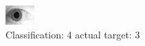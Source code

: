 \begin{figure}[h!]
\begin{center}
\includegraphics[width=0.60\columnwidth]{figures/ID1923_class_4_target_3.png}
\end{center}
\caption{ Classification: 4 actual target: 3}
\label{fig:ID1923_class_4_target_3}
\end{figure}
